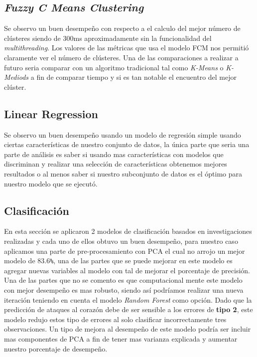 \documentclass[10pt,journal]{IEEEtran}
\begin{document}
\subsection{\textit{Fuzzy C Means Clustering}}

Se observo un buen desempeño con respecto a el calculo del mejor número de clústeres siendo de 300ms aproximadamente sin la funcionalidad del \textit{multithreading}. Los valores de las métricas que usa el modelo FCM nos permitió claramente ver el número de clústeres.  Una de las comparaciones a realizar a futuro seria comparar con un algoritmo tradicional tal como \textit{K-Means} o \textit{K-Mediods} a fin de comparar tiempo y si es tan notable el encuentro del mejor clúster.

\subsection{Linear Regression}


Se observo un buen desempeño usando un modelo de regresión simple usando ciertas características de nuestro conjunto de datos, la única parte que seria una parte de análisis es saber si usando mas características con modelos que discriminan y realizar una selección de características obtenemos mejores resultados o al menos saber si nuestro subconjunto de datos es el óptimo para nuestro modelo que se ejecutó.

\subsection{Clasificación}

En esta sección se aplicaron 2 modelos de clasificación basados en investigaciones realizadas y cada uno de ellos obtuvo un buen desempeño, para nuestro caso aplicamos una parte de pre-procesamiento con PCA el cual no arrojo un mejor modelo de 83.6\verb|%|, una de las partes que se puede mejorar en este modelo es agregar nuevas variables al modelo con tal de mejorar el porcentaje de precisión. Una de las partes que no se comento es que computacional mente este modelo con mejor desempeño es mas robusto, siendo así podríamos realizar una nueva iteración teniendo en cuenta el modelo \textit{Random Forest} como opción. Dado que la predicción de ataques al corazón debe de ser sensible a los errores de \textbf{tipo 2}, este modelo redujo estos tipo de errores al solo clasificar incorrectamente tres observaciones. Un tipo de mejora al desempeño de este modelo podría ser incluir mas componentes de PCA a fin de tener mas varianza explicada y aumentar nuestro porcentaje de desempeño.
\end{document}
